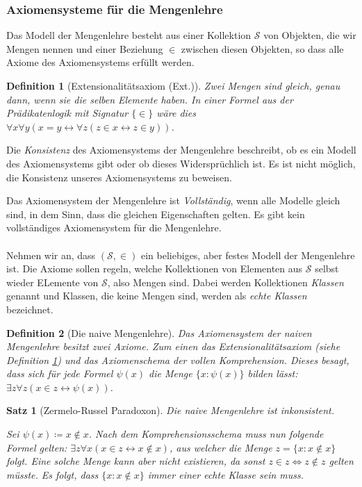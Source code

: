 \documentclass[german]{article}
\theoremstyle{break}
\theoremstyle{def_style}
\newtheorem{definition}{Definition}[section]
\theoremstyle{def_style}
\newtheorem{satz}{Satz}[section]
\theoremstyle{lemma_style}
\begin{document}
\subsubsection{Axiomensysteme für die Mengenlehre}

Das Modell der Mengenlehre besteht aus einer Kollektion $\mathcal{S}$ von Objekten, die wir Mengen nennen und einer Beziehung $\in$ zwischen diesen Objekten, so dass alle Axiome des Axiomensystems erfüllt werden.

\begin{definition}[Extensionalitätsaxiom (Ext.)]
	Zwei Mengen sind gleich, genau dann, wenn sie die selben Elemente haben. In einer Formel aus der Prädikatenlogik mit Signatur $\{\in\}$ wäre dies $\forall x \forall y (x=y \leftrightarrow \forall z (z \in x \leftrightarrow z \in y))$.
	\label{ExtAxiom}
\end{definition}

Die \textit{Konsistenz} des Axiomensystems der Mengenlehre beschreibt, ob es ein Modell des Axiomensystems gibt oder ob dieses Widersprüchlich ist. Es ist nicht möglich, die Konsistenz unseres Axiomensystems zu beweisen.

Das Axiomensystem der Mengenlehre ist \textit{Vollständig}, wenn alle Modelle \glqq gleich \grqq{} sind, in dem Sinn, dass die gleichen Eigenschaften gelten. Es gibt kein vollständiges Axiomensystem für die Mengenlehre.
\\
\\
Nehmen wir an, dass $(\mathcal{S},\in)$ ein beliebiges, aber festes Modell der Mengenlehre ist. Die Axiome sollen regeln, welche Kollektionen von Elementen aus $\mathcal{S}$ selbst wieder ELemente von $\mathcal{S}$, also Mengen sind. Dabei werden Kollektionen \textit{Klassen} genannt und Klassen, die keine Mengen sind, werden als \textit{echte Klassen} bezeichnet.

\begin{definition}[Die naive Mengenlehre]
	Das Axiomensystem der naiven Mengenlehre besitzt zwei Axiome. Zum einen das Extensionalitätsaxiom (siehe Definition \ref{ExtAxiom}) und das Axiomenschema der vollen Komprehension. Dieses besagt, dass sich für jede Formel $\psi(x)$ die Menge $\{x : \psi(x)\}$ bilden lässt: $\exists z \forall z(x \in z \leftrightarrow \psi(x))$.
\end{definition}

\begin{satz}[Zermelo-Russel Paradoxon]
	Die naive Mengenlehre ist inkonsistent.
	
	Sei $\psi(x)\coloneqq x\notin x$. Nach dem Komprehensionsschema muss nun folgende Formel gelten: $\exists z \forall x(x\in z \leftrightarrow x\notin x)$, aus welcher die Menge $z=\{x : x\notin x\}$ folgt. Eine solche Menge kann aber nicht existieren, da sonst $z\in z \Leftrightarrow z \notin z$ gelten müsste. Es folgt, dass $\{x:x\notin x\}$ immer einer echte Klasse sein muss.
\end{satz}
\end{document}
